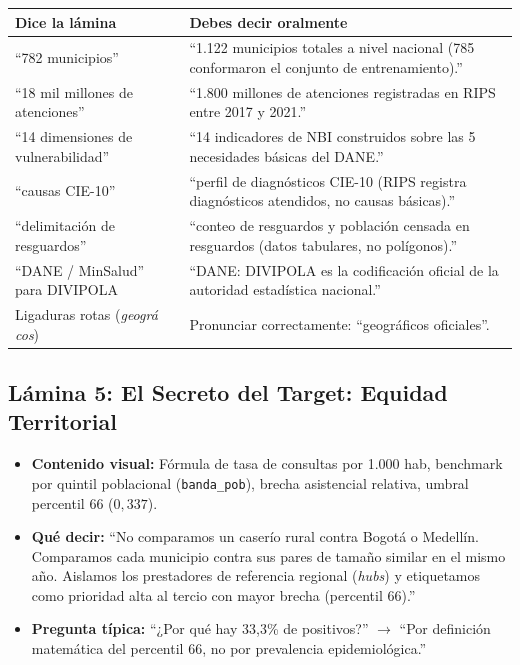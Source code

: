 \documentclass[11pt,a4paper]{article}
\newcommand{\code}[1]{\texttt{#1}}
\begin{document}
\begin{table}[H]
\centering
\small
\begin{tabularx}{\textwidth}{@{}L{4.2cm} Y@{}}
\toprule
\textbf{Dice la lámina} & \textbf{Debes decir oralmente} \\
\midrule
``782 municipios'' &
``1.122 municipios totales a nivel nacional (785 conformaron el conjunto de entrenamiento).'' \\
``18 mil millones de atenciones'' &
``1.800 millones de atenciones registradas en RIPS entre 2017 y 2021.'' \\
``14 dimensiones de vulnerabilidad'' &
``14 indicadores de NBI construidos sobre las 5 necesidades básicas del DANE.'' \\
``causas CIE-10'' &
``perfil de diagnósticos CIE-10 (RIPS registra diagnósticos atendidos, no causas básicas).'' \\
``delimitación de resguardos'' &
``conteo de resguardos y población censada en resguardos (datos tabulares, no polígonos).'' \\
``DANE / MinSalud'' para DIVIPOLA &
``DANE: DIVIPOLA es la codificación oficial de la autoridad estadística nacional.'' \\
Ligaduras rotas (\textit{geográ cos}) &
Pronunciar correctamente: ``geográficos oficiales''. \\
\bottomrule
\end{tabularx}
\end{table}

\subsection{Lámina 5: El Secreto del Target: Equidad Territorial}
\begin{itemize}[leftmargin=*]
  \item \textbf{Contenido visual:} Fórmula de tasa de consultas por 1.000 hab, benchmark por quintil poblacional (\code{banda_pob}), brecha asistencial relativa, umbral percentil 66 ($0{,}337$).
  \item \textbf{Qué decir:} ``No comparamos un caserío rural contra Bogotá o Medellín. Comparamos cada municipio contra sus pares de tamaño similar en el mismo año. Aislamos los prestadores de referencia regional (\textit{hubs}) y etiquetamos como prioridad alta al tercio con mayor brecha (percentil 66).''
  \item \textbf{Pregunta típica:} ``¿Por qué hay 33,3\% de positivos?'' $\rightarrow$ ``Por definición matemática del percentil 66, no por prevalencia epidemiológica.''
\end{itemize}
\end{document}
